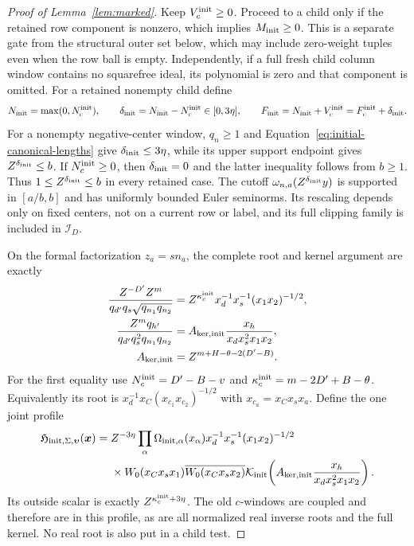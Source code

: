 \documentclass[11pt,a4paper]{article}
\numberwithin{equation}{section}
\numberwithin{figure}{section}
\theoremstyle{definition}
\theoremstyle{remark}
\begin{document}
\begin{proof}[Proof of Lemma~\ref{lem:marked}]
Keep \(V_c^{\rm init}\ge0\).  Proceed to a child only if the retained
row component is nonzero, which implies \(M_{\rm init}\ge0\).
This is a separate gate from the structural outer set below, which
may include zero-weight tuples even when the row ball is empty.
Independently, if a full fresh child column window contains no
squarefree ideal, its polynomial is zero and that component is omitted.
For a retained nonempty child define
\[
 N_{\rm init}=\max(0,N_c^{\rm init}),\qquad
 \delta_{\rm init}=N_{\rm init}-N_c^{\rm init}\in[0,3\eta],\qquad
 F_{\rm init}=N_{\rm init}+V_c^{\rm init}=F_c^{\rm init}+\delta_{\rm init}.
\]
For a nonempty negative-center window, \(q_n\ge1\) and
Equation~\eqref{eq:initial-canonical-lengths} give
\(\delta_{\rm init}\le3\eta\), while its upper support endpoint gives
\(Z^{\delta_{\rm init}}\le b\).  If \(N_c^{\rm init}\ge0\), then
\(\delta_{\rm init}=0\) and the latter inequality follows from \(b\ge1\).
Thus \(1\le Z^{\delta_{\rm init}}\le b\) in every retained case.
The cutoff \(\omega_{n,a}(Z^{\delta_{\rm init}}y)\) is supported in
\([a/b,b]\) and has uniformly bounded Euler seminorms.  Its rescaling
depends only on fixed centers, not on a current row or label, and its
full clipping family is included in \(\mathcal I_D\).

On the formal factorization \(z_a=sn_a\), the complete root and
kernel argument are exactly
\begin{equation}\label{eq:initial-root-kernel}
 \begin{split}
 \frac{Z^{-D'}Z^m}{q_{d'}q_s\sqrt{q_{n_1}q_{n_2}}}
 &=Z^{\kappa_c^{\rm init}}x_d^{-1}x_s^{-1}(x_1x_2)^{-1/2},\\
 \frac{Z^mq_{h'}}{q_{d'}q_s^2q_{n_1}q_{n_2}}
 &=A_{{\rm ker},{\rm init}}\frac{x_h}{x_dx_s^2x_1x_2},\\
 A_{{\rm ker},{\rm init}}&=Z^{m+H-\theta-2(D'-B)}.
 \end{split}
\end{equation}
For the first equality use \(N_c^{\rm init}=D'-B-v\) and
\(\kappa_c^{\rm init}=m-2D'+B-\theta\).  Equivalently its root is
\(x_d^{-1}x_C(x_{c_1}x_{c_2})^{-1/2}\) with
\(x_{c_a}=x_Cx_sx_a\).  Define the one joint profile
\begin{equation}\label{eq:initial-joint-profile}
 \begin{split}
 \mathfrak H_{{\rm init},\Sigma,\boldsymbol\upsilon}(\boldsymbol x)
 ={}&Z^{-3\eta}\prod_\alpha\Omega_{{\rm init},\alpha}(x_\alpha)
 x_d^{-1}x_s^{-1}(x_1x_2)^{-1/2}\\
 &\times W_0(x_Cx_sx_1)\overline{W_0(x_Cx_sx_2)}
 \mathcal K_{\rm init}\!\left(
 A_{{\rm ker},{\rm init}}\frac{x_h}{x_dx_s^2x_1x_2}\right).
 \end{split}
\end{equation}
Its outside scalar is exactly \(Z^{\kappa_c^{\rm init}+3\eta}\).
The old \(c\)-windows are coupled and therefore are in this profile,
as are all normalized real inverse roots and the full kernel.  No
real root is also put in a child test.


\end{proof}
\end{document}
